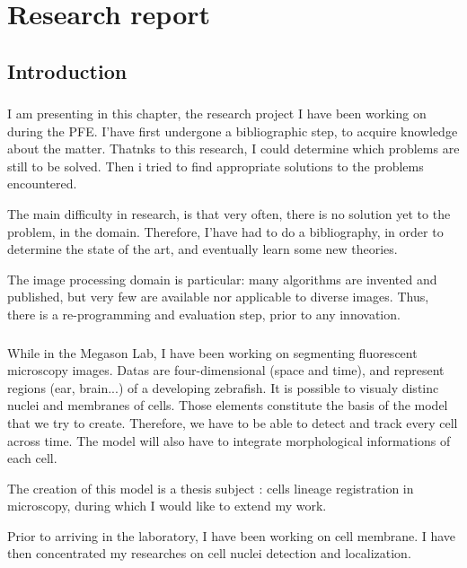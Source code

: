 

\chapter{Research report} 

\section*{Introduction}

\subsection*{}
I am presenting in this chapter, the research project I have been working on during the PFE. I'have first undergone a bibliographic step, to acquire knowledge about the matter. Thatnks to this research, I could determine which problems are still to be solved. Then i tried to find appropriate solutions to the problems encountered.

The main difficulty in research, is that very often, there is no solution yet to the problem, in the domain. Therefore, I'have had to do a bibliography, in order to determine the state of the art, and eventually learn some new theories.

The image processing domain is particular: many algorithms are invented and published, but very few are available nor applicable to diverse images.
Thus, there is a re-programming and evaluation step, prior to any innovation.

\subsection*{}

While in the Megason Lab, I have been working on segmenting fluorescent microscopy images.
Datas are four-dimensional (space and time), and represent regions (ear, brain...) of a developing zebrafish.
It is possible to visualy distinc nuclei and membranes of cells. Those elements constitute the basis of the model that we try to create.
Therefore, we have to be able to detect and track every cell across time. The model will also have to integrate morphological informations of each cell.

The creation of this model is a thesis subject : cells lineage registration in microscopy, during which I would like to extend my work.

Prior to arriving in the laboratory, I have been working on cell membrane. I have then concentrated my researches on cell nuclei detection and localization.




